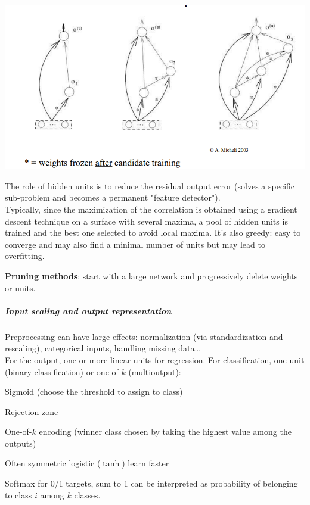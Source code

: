 \documentclass[10pt]{report}
\begin{document}
\begin{list}{}{}
\begin{list}{}{}
		\begin{center}
			\includegraphics[scale=0.5]{9.png}
		\end{center}
		The role of hidden units is to reduce the residual output error (solves a specific sub-problem and becomes a permanent "feature detector").\\
		Typically, since the maximization of the correlation is obtained using a gradient descent technique on a surface with several maxima, a pool of hidden units is trained and the best one selected to avoid local maxima. It's also greedy: easy to converge and may also find a minimal number of units but may lead to overfitting.
\end{list}
	\item \textbf{Pruning methods}: start with a large network and progressively delete weights or units.
\end{list}
\subparagraph{Input scaling and output representation} Preprocessing can have large effects: normalization (via standardization and rescaling), categorical inputs, handling missing data\ldots\\
For the output, one or more linear units for regression. For classification, one unit (binary classification) or one of $k$ (multioutput):
\begin{list}{}{}
	\item Sigmoid (choose the threshold to assign to class)
	\item Rejection zone
	\item One-of-$k$ encoding (winner class chosen by taking the highest value among the outputs)
	\item Often symmetric logistic ($\tanh$) learn faster
	\item Softmax for 0/1 targets, sum to 1 can be interpreted as probability of belonging to class $i$ among $k$ classes.
\end{list}
\pagebreak
\end{document}
